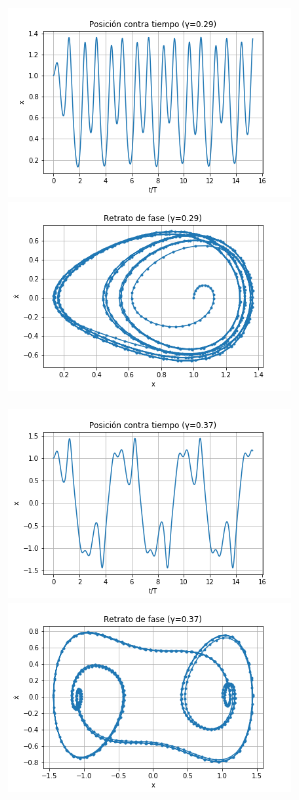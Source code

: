 \documentclass[letterpaper,12pt]{article}
\begin{document}
\begin{center}
	\includegraphics[height=5cm]{P3.png} \hspace*{\fill}
    \includegraphics[height=5cm]{R3.png}
\end{center}

\begin{center}
	\includegraphics[height=5cm]{P4.png} \hspace*{\fill}
    \includegraphics[height=5cm]{R4.png}
\end{center}
\end{document}
